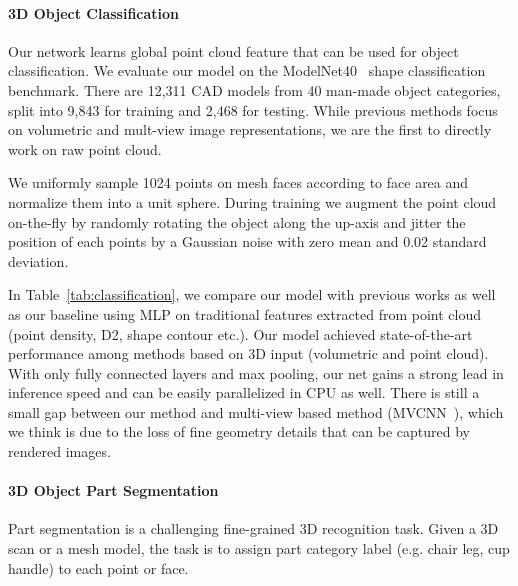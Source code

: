\paragraph{3D Object Classification} Our network learns global point cloud feature that can be used for object classification. We evaluate our model on the ModelNet40~\cite{wu20153d} shape classification benchmark. There are 12,311 CAD models from 40 man-made object categories, split into 9,843 for training and 2,468 for testing. While previous methods focus on volumetric and mult-view image representations, we are the first to directly work on raw point cloud.

We uniformly sample 1024 points on mesh faces according to face area and normalize them into a unit sphere. During training we augment the point cloud on-the-fly by randomly rotating the object along the up-axis and jitter the position of each points by a Gaussian noise with zero mean and 0.02 standard deviation. 


In Table~\ref{tab:classification}, we compare our model with previous works as well as our baseline using MLP on traditional features extracted from point cloud (point density, D2, shape contour etc.).
Our model achieved state-of-the-art performance among methods based on 3D input (volumetric and point cloud). With only fully connected layers and max pooling, our net gains a strong lead in inference speed and can be easily parallelized in CPU as well. There is still a small gap between our method and multi-view based method (MVCNN~\cite{su15mvcnn}), which we think is due to the loss of fine geometry details that can be captured by rendered images.

\paragraph{3D Object Part Segmentation} Part segmentation is a challenging fine-grained 3D recognition task. Given a 3D scan or a mesh model, the task is to assign part category label (e.g. chair leg, cup handle) to each point or face.



